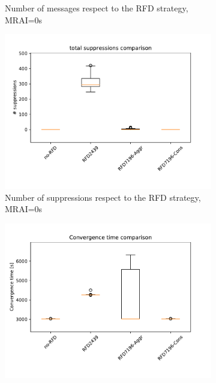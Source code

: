 \begin{figure}[H]
\begin{subfigure}[b]{0.325\textwidth}
         \caption{Number of messages respect to the RFD strategy, MRAI=0s}
         \label{fig:1000_RFD_MRAI30_messages_mice}
     \end{subfigure}
     \hfill
     \begin{subfigure}[b]{0.325\textwidth}
         \centering
         \includegraphics[width=\textwidth]{images/RFD/miceVSelephants/MultiMRAI/0/mice/cisco_1000MRAI0_rfd_comparison_suppressions_boxplot.pdf}
         \caption{Number of suppressions respect to the RFD strategy, MRAI=0s}
         \label{fig:1000_RFD_MRAI30_suppressions_mice}
     \end{subfigure}
     \vfill
     \begin{subfigure}[b]{0.325\textwidth}
         \centering
         \includegraphics[width=\textwidth]{images/RFD/miceVSelephants/MultiMRAI/15/mice/cisco_1000MRAI15_rfd_comparison_time_boxplot.pdf}

\end{subfigure}
\end{figure}
